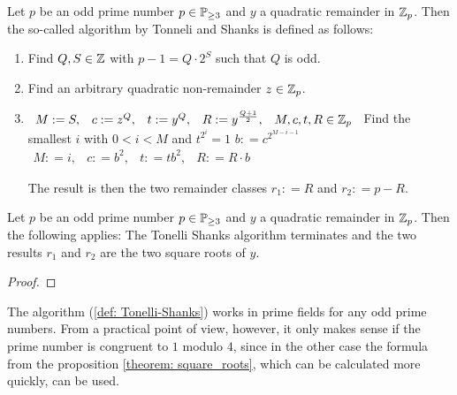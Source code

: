 \begin{definition} 
\label{def: Tonelli-Shanks}
Let $ p $ be an odd prime number $ p \in \mathbb{P} _{\geq 3} $ and $ y $ a quadratic remainder in $ \mathbb{Z}_p $. Then the so-called algorithm by Tonneli \cite{TA} and Shanks \cite{SD} is defined as follows:
\begin{enumerate}
\item Find $ Q, S \in \mathbb{Z} $ with $ p-1 = Q \cdot 2 ^ S $ such that $ Q $ is odd.
\item Find an arbitrary quadratic non-remainder $ z \in \mathbb{Z}_p $.
\item
\begin{algorithmic}
\State $ \begin{array}{ccccc}
M: = S, & c: = z ^ Q, & t: = y ^ Q, & R: = y ^{\frac{Q + 1}{2}}, & M, c, t, R \in \mathbb{Z}_p
\end{array} $
\State Find the smallest $ i $ with $ 0 <i <M $ and $ t ^{2 ^ i} = 1 $
\State $ b: = c ^{2 ^{M-i-1}} $
\State $ \begin{array}{ccccc}
M: = i, & c: = b ^ 2, & t: = tb ^ 2, & R: = R \cdot b
\end{array} $
\EndWhile
\end{algorithmic}
The result is then the two remainder classes $ r_1: = R $ and $ r_2: = p-R $.
\end{enumerate}
\end{definition}
\begin{theorem} Let $ p $ be an odd prime number $ p \in \mathbb{P} _{\geq 3} $ and $ y $ a quadratic remainder in $ \mathbb{Z}_p $. Then the following applies: The Tonelli Shanks algorithm terminates and the two results $ r_1 $ and $ r_2 $ are the two square roots of $ y $.
\end{theorem}
\begin{proof}
\end{proof}

\begin{remark}
The algorithm (\ref{def: Tonelli-Shanks}) works in prime fields for any odd prime numbers. From a practical point of view, however, it only makes sense if the prime number is congruent to $ 1 $ modulo $ 4 $, since in the other case the formula from the proposition \ref{theorem: square_roots}, which can be calculated more quickly, can be used.
\end{remark}

